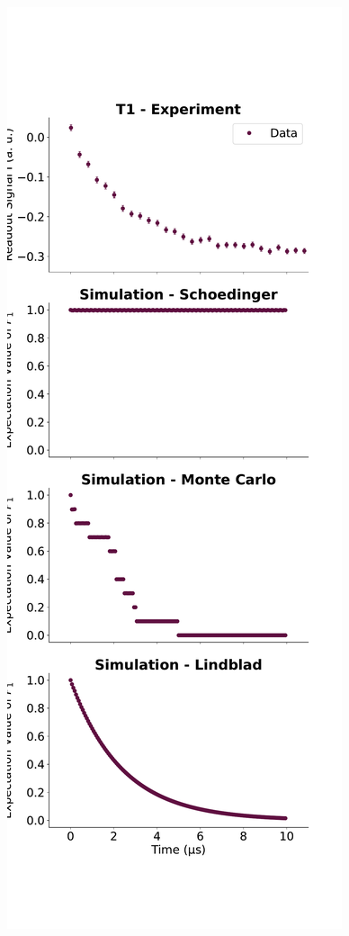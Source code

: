 \begin{figure}[h]
    \begin{minipage}{0.49\textwidth}
        \centering
        \includegraphics[]{Simulations/simulations_of_calibrations/Figs/qubit_T1.pdf}

\end{minipage}
\end{figure}
